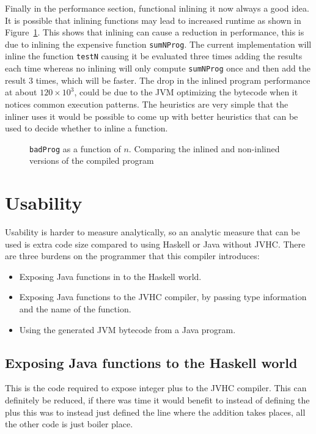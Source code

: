 \documentclass[float=false, crop=false]{standalone}
\newlength\gwidth
\newlength\gheight
\newcommand{\importMGraph}[3]{\setlength{\gwidth}{#2}\setlength{\gheight}{#3}{#1}}
\begin{document}
Finally in the performance section, functional inlining it now always a good idea.
It is possible that inlining functions may lead to increased runtime as shown in 
Figure~\ref{plot:badInline}. 
This shows that inlining can cause a reduction in performance, 
this is due to inlining the expensive function \texttt{sumNProg}. The current implementation 
will inline the function \texttt{testN} causing it be evaluated three times adding the results each time
whereas no inlining will only compute \texttt{sumNProg} once and then add the result 3 times, 
which will be faster. The drop in the inlined program performance at about $120 \times 10^3$, 
could be due to the JVM optimizing the bytecode when it notices common execution patterns.
The heuristics are very simple that the inliner uses it would be possible to 
come up with better heuristics that can be used to decide whether to inline a function.

\begin{figure}
  \centering
  \importMGraph{plotBadInline}{0.96\textwidth}{0.3\textwidth}
  \caption{\texttt{badProg} as a function of $n$. Comparing the inlined and non-inlined
  versions of the compiled program}
    \label{plot:badInline}
\end{figure}

\section{Usability}

Usability is harder to measure analytically, so an analytic measure that can be used is extra code size
compared to using Haskell or Java without JVHC.
There are three burdens on the programmer that this compiler introduces:
\begin{itemize}
  \item Exposing Java functions in to the Haskell world.
  \item Exposing Java functions to the JVHC compiler, by passing type information and the name 
    of the function.

  \item Using the generated JVM bytecode from a Java program.
\end{itemize}

\subsection{Exposing Java functions to the Haskell world}

This is the code required to expose integer plus to the JVHC compiler. 
This can definitely be reduced, if there was time it would benefit to instead of defining the plus
this was to instead just defined the line where the addition takes places, all
the other code is just boiler place.
\end{document}
